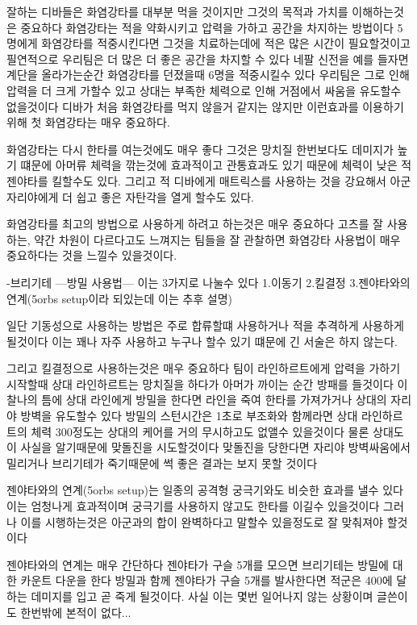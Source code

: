 잘하는 디바들은 화염강타를 대부분 먹을 것이지만 
그것의 목적과 가치를 이해하는것은 중요하다
화염강타는 적을 약화시키고 압력을 가하고 공간을 차지하는 방법이다
5명에게 화염강타를 적중시킨다면 그것을 치료하는데에 적은 많은 시간이 필요할것이고
필연적으로 우리팀은 더 많은 더 좋은 공간을 차지할 수 있다
네팔 신전을 예를 들자면 계단을 올라가는순간 화염강타를 던졌을때 6명을 적중시킬수 있다
우리팀은 그로 인해 압력을 더 크게 가할수 있고
상대는 부족한 체력으로 인해 거점에서 싸움을 유도할수 없을것이다
디바가 처음 화염강타를 먹지 않을거 같지는 않지만
이런효과를 이용하기 위해 첫 화염강타는 매우 중요하다.

화염강타는 다시 한타를 여는것에도 매우 좋다
그것은 망치질 한번보다도 데미지가 높기 떄문에 아머류 체력을 깎는것에 효과적이고
관통효과도 있기 때문에 체력이 낮은 적 젠야타를 킬할수도 있다.
그리고 적 디바에게 매트릭스를 사용하는 것을 강요해서 아군 자리야에게 더 쉽고 좋은 자탄각을 열게 할수도 있다.

화염강타를 최고의 방법으로 사용하게 하려고 하는것은 매우 중요하다
고츠를 잘 사용하는, 약간 차원이 다르다고도 느껴지는 팀들을 잘 관찰하면 화염강타 사용법이 매우 중요하다는 것을 느낄수 있을것이다.

-브리기테
---방밀 사용법---
이는 3가지로 나눌수 있다
1.이동기
2.킬결정
3.젠야타와의 연계(5orbs setup이라 되있는데 이는 추후 설명)

일단 기동성으로 사용하는 방법은 주로 합류할떄 사용하거나 적을 추격하게 사용하게 될것이다 
이는 꽤나 자주 사용하고 누구나 할수 있기 떄문에 긴 서술은 하지 않는다.

그리고 킬결정으로 사용하는것은 매우 중요하다
팀이 라인하르트에게 압력을 가하기 시작할때 상대 라인하르트는 망치질을 하다가 아머가 까이는 순간 방패를 들것이다
이 찰나의 틈에 상대 라인에게 방밀을 한다면 라인을 죽여 한타를 가져가거나 상대의 자리야 방벽을 유도할수 있다
방밀의 스턴시간은 1초로 부조화와 함께라면 상대 라인하르트의 체력 300정도는 상대의 케어를 거의 무시하고도 없앨수 있을것이다
물론 상대도 이 사실을 알기때문에 맞돌진을 시도할것이다
맞돌진을 당한다면 자리야 방벽싸움에서 밀리거나 브리기테가 죽기때문에 썩 좋은 결과는 보지 못할 것이다

젠야타와의 연계(5orbs setup)는
일종의 공격형 궁극기와도 비슷한 효과를 낼수 있다
이는 엄청나게 효과적이며 궁극기를 사용하지 않고도 한타를 이길수 있을것이다
그러나 이를 시행하는것은 아군과의 합이 완벽하다고 말할수 있을정도로 잘 맞춰져야 할것이다

젠야타와의 연계는 매우 간단하다
젠야타가 구슬 5개를 모으면 브리기테는 방밀에 대한 카운트 다운을 한다
방밀과 함께 젠야타가 구슬 5개를 발사한다면 적군은 400에 달하는 데미지를 입고 곧 죽게 될것이다.
사실 이는 몇번 일어나지 않는 상황이며 글쓴이도 한번밖에 본적이 없다...

